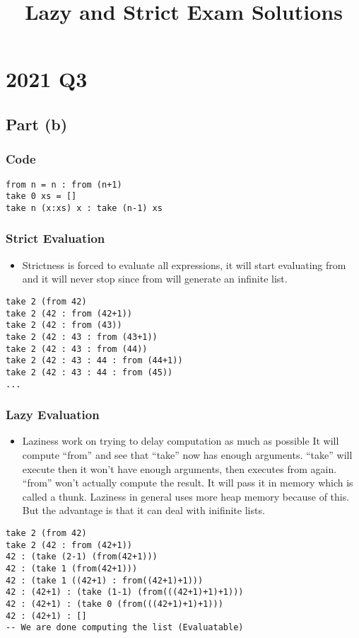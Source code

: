 \documentclass[11pt]{article}
\date{}
\title{Lazy and Strict Exam Solutions}
\begin{document}
\maketitle
\section{2021 Q3}
\label{sec:orgde66d84}
\subsection{Part (b)}
\label{sec:org0bd0b8c}
\subsubsection{Code}
\label{sec:org02015c0}
\begin{verbatim}
from n = n : from (n+1)
take 0 xs = []
take n (x:xs) x : take (n-1) xs
\end{verbatim}
\subsubsection{Strict Evaluation}
\label{sec:org63805f0}
\begin{itemize}
\item Strictness is forced to evaluate all expressions, it will start
evaluating from and it will never stop since from will generate
an infinite list.
\end{itemize}
\begin{verbatim}
take 2 (from 42)
take 2 (42 : from (42+1))
take 2 (42 : from (43))
take 2 (42 : 43 : from (43+1))
take 2 (42 : 43 : from (44))
take 2 (42 : 43 : 44 : from (44+1))
take 2 (42 : 43 : 44 : from (45))
...
\end{verbatim}
\subsubsection{Lazy Evaluation}
\label{sec:org0fd0bf0}
\begin{itemize}
\item Laziness work on trying to delay computation as much as possible
It will compute ``from'' and see that ``take'' now has enough arguments.
``take'' will execute then it won't have enough arguments, then executes from
again. ``from'' won't actually compute the result. It will pass it in memory
which is called a thunk. Laziness in general uses more heap memory because of this.
But the advantage is that it can deal with inifinite lists.
\end{itemize}
\begin{verbatim}
take 2 (from 42)
take 2 (42 : from (42+1))
42 : (take (2-1) (from(42+1)))
42 : (take 1 (from(42+1)))
42 : (take 1 ((42+1) : from((42+1)+1)))
42 : (42+1) : (take (1-1) (from(((42+1)+1)+1)))
42 : (42+1) : (take 0 (from(((42+1)+1)+1)))
42 : (42+1) : []
-- We are done computing the list (Evaluatable)
\end{verbatim}
\end{document}
